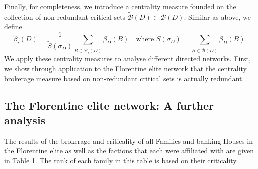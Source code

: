 Finally, for completeness, we introduce a centrality measure founded on the collection of non-redundant critical sets $\widetilde{\mathcal{B}} (D) \subset \mathcal{B} (D)$. Similar as above, we define
\begin{equation}
\widetilde{\beta}_i (D) = \frac{1}{\widetilde{S} (\sigma_D)} \sum_{B \in \widetilde{\mathcal{B}}_i (D)} \beta_D (B) \quad \mbox{where } \widetilde{S} (\sigma_D) = \sum_{B \in \widetilde{\mathcal{B}} (D)} \beta_D (B) .
\end{equation}
We apply these centrality measures to analyse different directed networks. First, we show through application to the Florentine elite network that the centrality brokerage measure based on non-redundant critical sets is actually redundant.

\subsection{The Florentine elite network: A further analysis}

The results of the brokerage and criticality of all Families and banking Houses in the Florentine elite as well as the factions that each were affiliated with are given in Table 1. The rank of each family in this table is based on their criticality.

